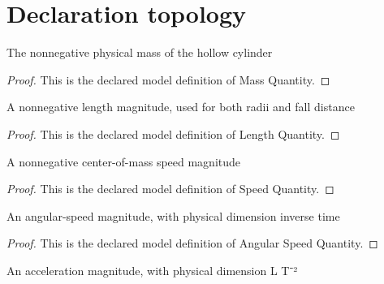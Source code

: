 \section{Declaration topology}
\begin{definition}
  \label{def:physics:phyx-mini-0780:phyxminiproblems-problemphyxmini0780-massquantity}
  The nonnegative physical mass of the hollow cylinder
\end{definition}
\begin{proof}
  This is the declared model definition of Mass Quantity.
\end{proof}
\begin{definition}
  \label{def:physics:phyx-mini-0780:phyxminiproblems-problemphyxmini0780-lengthquantity}
  A nonnegative length magnitude, used for both radii and fall distance
\end{definition}
\begin{proof}
  This is the declared model definition of Length Quantity.
\end{proof}
\begin{definition}
  \label{def:physics:phyx-mini-0780:phyxminiproblems-problemphyxmini0780-speedquantity}
  A nonnegative center-of-mass speed magnitude
\end{definition}
\begin{proof}
  This is the declared model definition of Speed Quantity.
\end{proof}
\begin{definition}
  \label{def:physics:phyx-mini-0780:phyxminiproblems-problemphyxmini0780-angularspeedquantity}
  An angular-speed magnitude, with physical dimension inverse time
\end{definition}
\begin{proof}
  This is the declared model definition of Angular Speed Quantity.
\end{proof}
\begin{definition}
  \label{def:physics:phyx-mini-0780:phyxminiproblems-problemphyxmini0780-accelerationquantity}
  An acceleration magnitude, with physical dimension L T⁻²
\end{definition}
